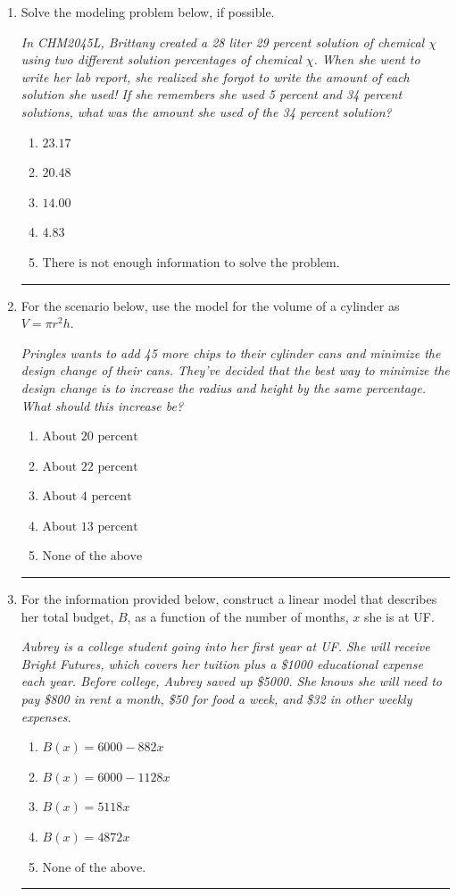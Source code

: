 \documentclass[14pt]{extbook}
\newcommand{\litem}[1]{\item#1\hspace*{-1cm}\rule{\textwidth}{0.4pt}}
\begin{document}
\begin{enumerate}
{\begin{enumerate}[label=\Alph*.]
\end{enumerate} }
\litem{
Solve the modeling problem below, if possible.
\begin{center}
    \textit{ In CHM2045L, Brittany created a 28 liter 29 percent solution of chemical $\chi$ using two different solution percentages of chemical $\chi$. When she went to write her lab report, she realized she forgot to write the amount of each solution she used! If she remembers she used 5 percent and 34 percent solutions, what was the amount she used of the 34 percent solution? }
\end{center}
\begin{enumerate}[label=\Alph*.]
\item \( 23.17 \)
\item \( 20.48 \)
\item \( 14.00 \)
\item \( 4.83 \)
\item \( \text{There is not enough information to solve the problem.} \)

\end{enumerate} }
\litem{
For the scenario below, use the model for the volume of a cylinder as $V = \pi r^2 h$.
\begin{center}
    \textit{ Pringles wants to add 45 \text{percent} more chips to their cylinder cans and minimize the design change of their cans. They've decided that the best way to minimize the design change is to increase the radius and height by the same percentage. What should this increase be? }
\end{center}
\begin{enumerate}[label=\Alph*.]
\item \( \text{About } 20 \text{ percent} \)
\item \( \text{About } 22 \text{ percent} \)
\item \( \text{About } 4 \text{ percent} \)
\item \( \text{About } 13 \text{ percent} \)
\item \( \text{None of the above} \)

\end{enumerate} }
\litem{
For the information provided below, construct a linear model that describes her total budget, $B$, as a function of the number of months, $x$ she is at UF.
\begin{center}
    \textit{ Aubrey is a college student going into her first year at UF. She will receive Bright Futures, which covers her tuition plus a \$1000 educational expense each year. Before college, Aubrey saved up \$5000. She knows she will need to pay \$800 in rent a month, \$50 for food a week, and \$32 in other weekly expenses. }
\end{center}
\begin{enumerate}[label=\Alph*.]
\item \( B(x) = 6000 - 882 x \)
\item \( B(x) = 6000 - 1128 x \)
\item \( B(x) = 5118 x \)
\item \( B(x) = 4872 x \)
\item \( \text{None of the above.} \)


\end{enumerate}}
\end{enumerate}
\end{document}
